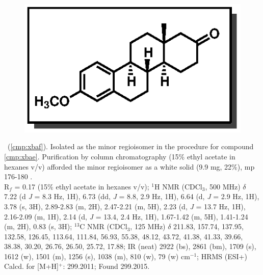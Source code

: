 \vspace{10pt}
\begin{figure}
  \vspace{-25pt}
  \begin{center}
    \includegraphics[scale=0.8]{chp_singlecarbon/images/xbaf}
  \end{center}
  \vspace{-30pt}
\end{figure}\noindent \textbf{\CMPxbaf}\ (\ref{cmp:xbaf}). Isolated as the minor regioisomer in
the procedure for compound \ref{cmp:xbae}. Purification by column chromatography (15\% ethyl acetate
 in hexanes v/v) afforded the minor regioisomer as a white solid (9.9 mg, 22\%), mp 176-180 \degc.\\
 R$_f$ = 0.17 (15\% ethyl acetate in hexanes v/v); $^1$H NMR (CDCl$_3$, 500 MHz) $\delta$ 7.22 (d
 \textit{J} = 8.3 Hz, 1H), 6.73 (dd, \textit{J} = 8.8, 2.9 Hz, 1H), 6.64 (d, \textit{J} = 2.9 Hz,
 1H), 3.78 (s, 3H), 2.89-2.83 (m, 2H), 2.47-2.21 (m, 5H), 2.23 (d, \textit{J} = 13.7 Hz, 1H),
 2.16-2.09 (m, 1H), 2.14 (d, \textit{J} = 13.4, 2.4 Hz, 1H), 1.67-1.42 (m, 5H), 1.41-1.24 (m, 2H),
 0.83 (s, 3H); $^{13}$C NMR (CDCl$_3$, 125 MHz) $\delta$ 211.83, 157.74, 137.95, 132.58, 126.45,
 113.64, 111.84, 56.93, 55.38, 48.12, 43.72, 41.38, 41.33, 39.66, 38.38, 30.20, 26.76, 26.50, 25.72,
 17.88; IR (neat) 2922 (bs), 2861 (bm), 1709 (s), 1612 (w), 1501 (m), 1256 (s), 1038 (m), 810 (w),
 79 (w) cm$^{-1}$; HRMS (ESI+) Calcd. for  [M+H]$^+$: 299.2011; Found 299.2015.

